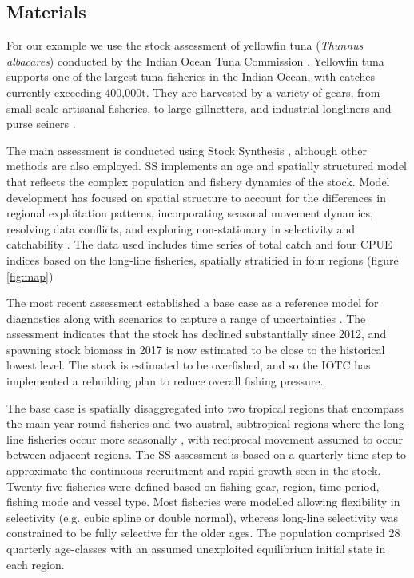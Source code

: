 \documentclass[12pt,halfline,a4paper,nonumbib]{ouparticle}
\begin{document}
\subsection{Materials}

For our example we use the stock assessment of yellowfin tuna (\textit{Thunnus albacares}) conducted by the Indian Ocean Tuna Commission \parencite{IOTWPTT21}. Yellowfin tuna supports one of the largest tuna fisheries in the Indian Ocean, with catches currently exceeding 400,000t. They are harvested by a variety of gears, from small-scale artisanal fisheries, to large gillnetters, and industrial longliners and purse seiners \parencite{fiorellato2019tt}.

The main assessment is conducted using Stock Synthesis \parencite[SS,][]{methot2013stock}, although other methods are also employed. SS implements an age and spatially structured model that reflects the complex population and fishery dynamics of the stock. Model development has focused on spatial structure to account for the differences in regional exploitation patterns, incorporating seasonal movement dynamics, resolving data conflicts, and exploring non-stationary in selectivity and catchability \parencite{urtizberea2018yft}. The data used includes time series of total catch and four CPUE indices based on the long-line fisheries, spatially stratified in four regions (figure \ref{fig:map})
 
The most recent assessment established a base case as a reference model for diagnostics along with scenarios to capture a range of uncertainties \parencite{fu2018yft}. The assessment indicates that the stock  has declined substantially since 2012, and spawning stock biomass in 2017 is now estimated to be close to the historical lowest level. The stock is estimated to be overfished, and so the IOTC has implemented a rebuilding plan to reduce overall fishing pressure.  

The base case is spatially disaggregated into two tropical regions that encompass the main year-round fisheries and two austral, subtropical regions where the long-line fisheries occur more seasonally \parencite{langley2015yft}, with reciprocal movement assumed to occur between adjacent regions. The SS assessment is based on a quarterly time step to approximate the continuous recruitment and rapid growth seen in the stock. Twenty-five fisheries were defined based on fishing gear, region, time period, fishing mode and vessel type. Most fisheries were modelled allowing flexibility in selectivity (e.g. cubic spline or double normal), whereas long-line selectivity was constrained to be fully selective for the older ages. The population comprised 28 quarterly age-classes with an assumed unexploited equilibrium initial state in each region. 
\end{document}
